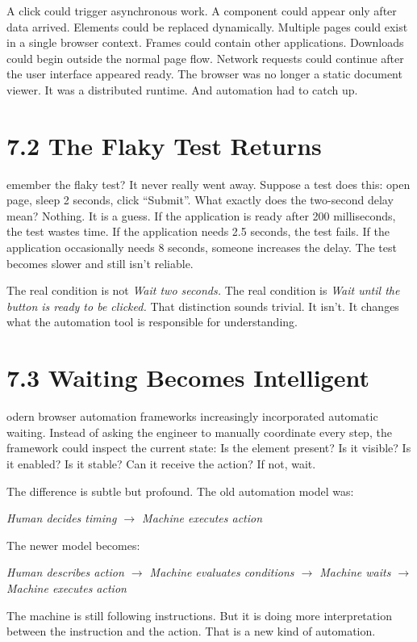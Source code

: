 \documentclass[11pt, a4paper, openany]{book}
\newcommand{\initialcap}[1]{{\fontfamily{lmss}\selectfont\huge\textbf{#1}}}
\begin{document}
A click could trigger asynchronous work. A component could appear only after data arrived. Elements could be replaced dynamically. Multiple pages could exist in a single browser context. Frames could contain other applications. Downloads could begin outside the normal page flow. Network requests could continue after the user interface appeared ready. The browser was no longer a static document viewer. It was a distributed runtime. And automation had to catch up.

\section{7.2 The Flaky Test Returns}
\noindent \initialcap{R}emember the flaky test? It never really went away. Suppose a test does this: open page, sleep 2 seconds, click ``Submit''. What exactly does the two-second delay mean? Nothing. It is a guess. If the application is ready after 200 milliseconds, the test wastes time. If the application needs 2.5 seconds, the test fails. If the application occasionally needs 8 seconds, someone increases the delay. The test becomes slower and still isn't reliable.

The real condition is not \textit{Wait two seconds.} The real condition is \textit{Wait until the button is ready to be clicked.} That distinction sounds trivial. It isn't. It changes what the automation tool is responsible for understanding.

\section{7.3 Waiting Becomes Intelligent}
\noindent \initialcap{M}odern browser automation frameworks increasingly incorporated automatic waiting. Instead of asking the engineer to manually coordinate every step, the framework could inspect the current state: Is the element present? Is it visible? Is it enabled? Is it stable? Can it receive the action? If not, wait.

The difference is subtle but profound. The old automation model was:
\begin{center}
\textit{Human decides timing $\rightarrow$ Machine executes action}
\end{center}
The newer model becomes:
\begin{center}
\textit{Human describes action $\rightarrow$ Machine evaluates conditions $\rightarrow$ Machine waits $\rightarrow$ Machine executes action}
\end{center}
The machine is still following instructions. But it is doing more interpretation between the instruction and the action. That is a new kind of automation.
\end{document}
